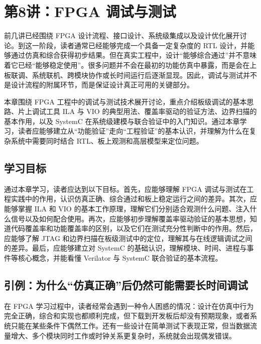 \chapter{第8讲：FPGA
调试与测试}\label{ux7b2c8ux8bb2fpga-ux8c03ux8bd5ux4e0eux6d4bux8bd5}

前几讲已经围绕 FPGA
设计流程、接口设计、系统级集成以及设计优化展开讨论。到这一阶段，读者通常已经能够完成一个具备一定复杂度的
RTL
设计，并能够通过仿真和综合获得初步结果。但在真实工程中，设计``能够综合通过''并不意味着它已经``能够稳定使用''。很多问题并不会在最初的功能仿真中暴露，而是会在上板联调、系统联机、跨模块协作或长时间运行后逐渐显现。因此，调试与测试并不是设计流程的附属环节，而是保证设计真正可用的关键部分。

本章围绕 FPGA
工程中的调试与测试技术展开讨论，重点介绍板级调试的基本思路、片上调试工具
ILA 与 VIO 的典型用法、覆盖率驱动的验证方法、边界扫描的基本作用，以及
SystemC
在系统级建模与联合验证中的入门知识。通过本章学习，读者应能够建立从``功能验证''走向``工程验证''的基本认识，并理解为什么在复杂系统中需要同时结合
RTL、板上观测和高层模型来定位问题。

\section{学习目标}\label{ux5b66ux4e60ux76eeux6807}

通过本章学习，读者应达到以下目标。首先，应能够理解 FPGA
调试与测试在工程实践中的作用，认识仿真正确、综合通过和板上稳定运行之间的差异。其次，应能够掌握
ILA 和 VIO
的基本工作原理，理解它们分别适合观测什么问题、注入什么信号以及如何配合使用。再次，应能够初步理解覆盖率驱动验证的基本思想，知道代码覆盖率和功能覆盖率的区别，以及它们在测试充分性判断中的作用。然后，应能够了解
JTAG
和边界扫描在板级测试中的定位，理解其与在线逻辑调试之间的差异。最后，应能够建立对
SystemC 的基础认识，理解模块、时间、进程与事件等核心概念，并能看懂
Verilator 与 SystemC 联合验证的基本流程。

\section{引例：为什么``仿真正确''后仍然可能需要长时间调试}\label{ux5f15ux4f8bux4e3aux4ec0ux4e48ux4effux771fux6b63ux786eux540eux4ecdux7136ux53efux80fdux9700ux8981ux957fux65f6ux95f4ux8c03ux8bd5}

在 FPGA
学习过程中，读者经常会遇到一种令人困惑的情况：设计在仿真中行为完全正确，综合和实现也都顺利完成，但下载到开发板后却没有预期现象，或者系统只能在某些条件下偶然工作。还有一些设计在简单测试下表现正常，但当数据流量增大、多个模块同时工作或时钟关系更复杂时，系统就会出现偶发错误。

